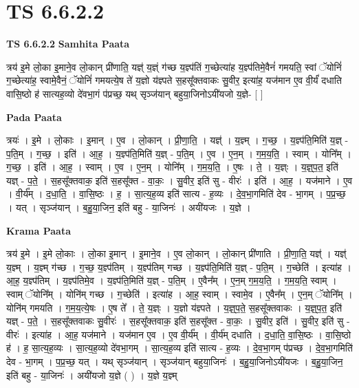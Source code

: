 \documentclass[17pt]{extarticle}
\begin{document}
\section{ TS 6.6.2.2 }

\textbf{TS 6.6.2.2 } \newline
\textbf{Samhita Paata} \newline

त्रय॑ इ॒मे लो॒का इ॒माने॒व लो॒कान् प्री॑णाति॒ यज्ञ्॑ य॒ज्ञ्ं ग॑च्छ य॒ज्ञ्प॑तिं ग॒च्छेत्या॑ह य॒ज्ञ्प॑तिमे॒वैनं॑ गमयति॒ स्वां ॅयोनिं॑ ग॒च्छेत्या॑ह॒ स्वामे॒वैनं॒ ॅयोनिं॑ गमयत्ये॒ष ते॑ य॒ज्ञो य॑ज्ञ्पते स॒हसू᳚क्तवाकः सु॒वीर॒ इत्या॑ह॒ यज॑मान ए॒व वी॒र्यं॑ दधाति वासि॒ष्ठो ह॑ सात्यह॒व्यो दे॑वभा॒गं प॑प्रच्छ॒ यथ् सृञ्ज॑यान् बहुया॒जिनोऽयी॑यजो य॒ज्ञे- [  ] \newline

\textbf{Pada Paata} \newline

त्रयः॑ । इ॒मे । लो॒काः । इ॒मान् । ए॒व । लो॒कान् । प्री॒णा॒ति॒ । यज्ञ्॑ । य॒ज्ञ्म् । ग॒च्छ॒ । य॒ज्ञ्प॑ति॒मिति॑ य॒ज्ञ् - प॒ति॒म् । ग॒च्छ॒ । इति॑ । आ॒ह॒ । य॒ज्ञ्प॑ति॒मिति॑ य॒ज्ञ् - प॒ति॒म् । ए॒व । ए॒न॒म् । ग॒म॒य॒ति॒ । स्वाम् । योनि᳚म् । ग॒च्छ॒ । इति॑ । आ॒ह॒ । स्वाम् । ए॒व । ए॒न॒म् । योनि᳚म् । ग॒म॒य॒ति॒ । ए॒षः । ते॒ । य॒ज्ञ्ः । य॒ज्ञ्॒प॒त॒ इति॑ यज्ञ् - प॒ते॒ । स॒हसू᳚क्तवाक॒ इति॑ स॒हसू᳚क्त - वा॒कः॒ । सु॒वीर॒ इति॑ सु - वीरः॑ । इति॑ । आ॒ह॒ । यज॑माने । ए॒व । वी॒र्य᳚म् । द॒धा॒ति॒ । वा॒सि॒ष्ठः । ह॒ । सा॒त्य॒ह॒व्य इति॑ सात्य - ह॒व्यः । दे॒व॒भा॒गमिति॑ देव - भा॒गम् । प॒प्र॒च्छ॒ । यत् । सृञ्ज॑यान् । ब॒हु॒या॒जिन॒ इति॑ बहु - या॒जिनः॑ । अयी॑यजः । य॒ज्ञे ।  \newline


\textbf{Krama Paata} \newline

त्रय॑ इ॒मे । इ॒मे लो॒काः । लो॒का इ॒मान् । इ॒माने॒व । ए॒व लो॒कान् । लो॒कान् प्री॑णाति । प्री॒णा॒ति॒ यज्ञ्॑ । यज्ञ्॑ य॒ज्ञ्म् । य॒ज्ञ्म् ग॑च्छ । ग॒च्छ॒ य॒ज्ञ्प॑तिम् । य॒ज्ञ्प॑तिम् गच्छ । य॒ज्ञ्प॑ति॒मिति॑ य॒ज्ञ् - प॒ति॒म् । ग॒च्छेति॑ । इत्या॑ह । आ॒ह॒ य॒ज्ञ्प॑तिम् । य॒ज्ञ्प॑तिमे॒व । य॒ज्ञ्प॑ति॒मिति॑ य॒ज्ञ् - प॒ति॒म् । ए॒वैन᳚म् । ए॒न॒म् ग॒म॒य॒ति॒ । ग॒म॒य॒ति॒ स्वाम् । स्वाम् ॅयोनि᳚म् । योनि॑म् गच्छ । ग॒च्छेति॑ । इत्या॑ह । आ॒ह॒ स्वाम् । स्वामे॒व । ए॒वैन᳚म् । ए॒न॒म् ॅयोनि᳚म् । योनि॑म् गमयति । ग॒म॒य॒त्ये॒षः । ए॒ष ते᳚ । ते॒ य॒ज्ञ्ः । य॒ज्ञो य॑ज्ञ्पते । य॒ज्ञ्॒प॒ते॒ स॒हसू᳚क्तवाकः । य॒ज्ञ्॒प॒त॒ इति॑ यज्ञ् - प॒ते॒ । स॒हसू᳚क्तवाकः सु॒वीरः॑ । स॒हसू᳚क्तवाक॒ इति॑ स॒हसू᳚क्त - वा॒कः॒ । सु॒वीर॒ इति॑ । सु॒वीर॒ इति॑ सु - वीरः॑ । इत्या॑ह । आ॒ह॒ यज॑माने । यज॑मान ए॒व । ए॒व वी॒र्य᳚म् । वी॒र्य॑म् दधाति । द॒धा॒ति॒ वा॒सि॒ष्ठः । वा॒सि॒ष्ठो ह॑ । ह॒ सा॒त्य॒ह॒व्यः । सा॒त्य॒ह॒व्यो दे॑वभा॒गम् । सा॒त्य॒ह॒व्य इति॑ सात्य - ह॒व्यः । दे॒व॒भा॒गम् प॑प्रच्छ । दे॒व॒भा॒गमिति॑ देव - भा॒गम् । प॒प्र॒च्छ॒ यत् । यथ् सृञ्ज॑यान् । सृञ्ज॑यान् बहुया॒जिनः॑ । ब॒हु॒या॒जिनोऽयी॑यजः । ब॒हु॒या॒जिन॒ इति॑ बहु - या॒जिनः॑ । अयी॑यजो य॒ज्ञे ( ) । य॒ज्ञे य॒ज्ञ्म् \newline
\end{document}
